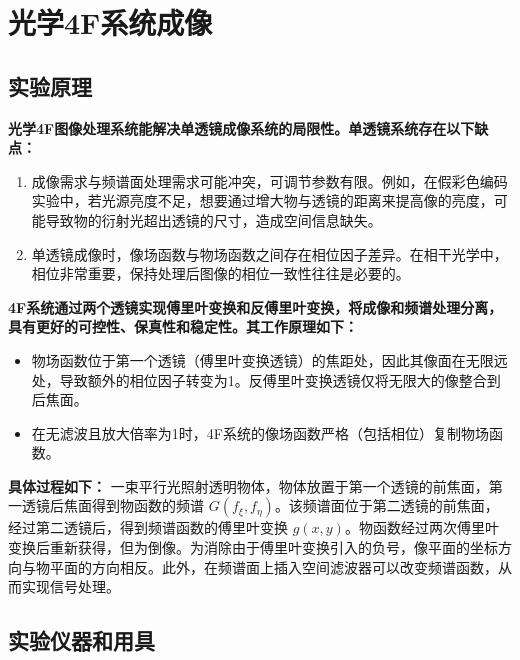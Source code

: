 \documentclass[zihao=5, UTF8]{article}
\theoremstyle{MyLineTheoremStyle} %
\theoremstyle{MyBlockTheoremStyle} %
\theoremstyle{MySubsubsectionStyle} %
\begin{document}



\section{光学4F系统成像}

\subsection{实验原理}

\textbf{光学4F图像处理系统能解决单透镜成像系统的局限性。单透镜系统存在以下缺点：}
\begin{enumerate}
    \item 成像需求与频谱面处理需求可能冲突，可调节参数有限。例如，在假彩色编码实验中，若光源亮度不足，想要通过增大物与透镜的距离来提高像的亮度，可能导致物的衍射光超出透镜的尺寸，造成空间信息缺失。
    \item 单透镜成像时，像场函数与物场函数之间存在相位因子差异。在相干光学中，相位非常重要，保持处理后图像的相位一致性往往是必要的。
\end{enumerate}

\textbf{4F系统通过两个透镜实现傅里叶变换和反傅里叶变换，将成像和频谱处理分离，具有更好的可控性、保真性和稳定性。其工作原理如下：}
\begin{itemize}
    \item 物场函数位于第一个透镜（傅里叶变换透镜）的焦距处，因此其像面在无限远处，导致额外的相位因子转变为1。反傅里叶变换透镜仅将无限大的像整合到后焦面。
    \item 在无滤波且放大倍率为1时，4F系统的像场函数严格（包括相位）复制物场函数。
\end{itemize}

\textbf{具体过程如下：}
一束平行光照射透明物体，物体放置于第一个透镜的前焦面，第一透镜后焦面得到物函数的频谱 \(G(f_\xi, f_\eta)\)。该频谱面位于第二透镜的前焦面，经过第二透镜后，得到频谱函数的傅里叶变换 \(g(x, y)\)。物函数经过两次傅里叶变换后重新获得，但为倒像。为消除由于傅里叶变换引入的负号，像平面的坐标方向与物平面的方向相反。此外，在频谱面上插入空间滤波器可以改变频谱函数，从而实现信号处理。


\subsection{实验仪器和用具}
\end{document}
